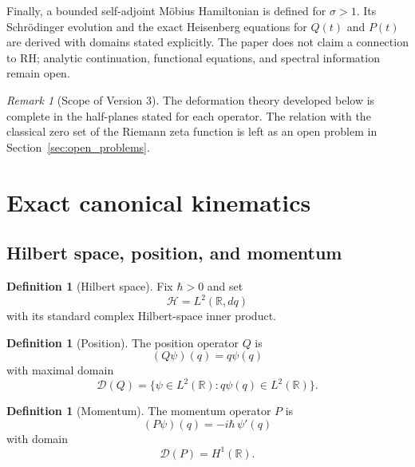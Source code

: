 \documentclass[11pt]{amsart}
\numberwithin{equation}{section}
\theoremstyle{plain}
\theoremstyle{definition}
\newtheorem{definition}[theorem]{Definition}
\theoremstyle{remark}
\newtheorem{remark}[theorem]{Remark}
\newcommand{\R}{\mathbb{R}}
\newcommand{\Hil}{\mathcal{H}}
\newcommand{\Dom}{\mathcal{D}}
\begin{document}
Finally, a bounded self-adjoint M\"obius Hamiltonian is defined for
\(\sigma>1\).  Its Schr\"odinger evolution and the exact Heisenberg equations
for \(Q(t)\) and \(P(t)\) are derived with domains stated explicitly.  The
paper does not claim a connection to RH; analytic continuation, functional
equations, and spectral information remain open.

\begin{remark}[Scope of Version 3]
\label{rem:v3_scope}
The deformation theory developed below is complete in the half-planes stated
for each operator.  The relation with the classical zero set of the Riemann
zeta function is left as an open problem in Section~\ref{sec:open_problems}.
\end{remark}

\section{Exact canonical kinematics}
\label{sec:kinematics}

\subsection{Hilbert space, position, and momentum}
\label{subsec:QP_definitions}

\begin{definition}[Hilbert space]
\label{def:hilbert_space}
Fix $\hbar>0$ and set
\begin{equation}
\Hil=L^2(\R,dq)
\label{eq:hilbert_space}
\end{equation}
with its standard complex Hilbert-space inner product.
\end{definition}

\begin{definition}[Position]
\label{def:position}
The position operator $Q$ is
\begin{equation}
(Q\psi)(q)=q\psi(q)
\label{eq:Q_action}
\end{equation}
with maximal domain
\begin{equation}
\Dom(Q)=\{\psi\in L^2(\R):q\psi(q)\in L^2(\R)\}.
\label{eq:Q_domain}
\end{equation}
\end{definition}

\begin{definition}[Momentum]
\label{def:momentum}
The momentum operator $P$ is
\begin{equation}
(P\psi)(q)=-i\hbar\,\psi'(q)
\label{eq:P_action}
\end{equation}
with domain
\begin{equation}
\Dom(P)=H^1(\R).
\label{eq:P_domain}
\end{equation}
\end{definition}
\end{document}
